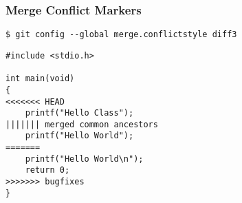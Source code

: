 \begin{frame}[fragile]
    \frametitle{Merge Conflict Markers}
    \small
    \begin{verbatim}
$ git config --global merge.conflictstyle diff3
    \end{verbatim}
    \begin{verbatim}
#include <stdio.h>

int main(void)
{
<<<<<<< HEAD
    printf("Hello Class");
||||||| merged common ancestors
    printf("Hello World");
=======
    printf("Hello World\n");
    return 0;
>>>>>>> bugfixes
}
    \end{verbatim}
\end{frame}

